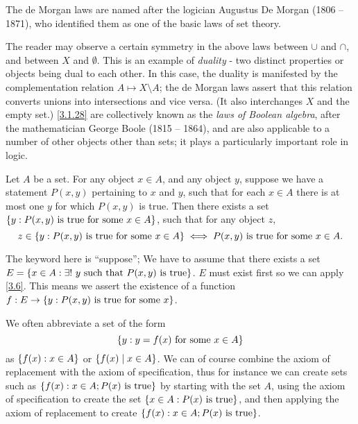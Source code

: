 \begin{rmk}\label{3.1.29}
  The de Morgan laws are named after the logician Augustus De Morgan (1806 -- 1871), who identified them as one of the basic laws of set theory.
\end{rmk}

\begin{rmk}\label{3.1.30}
  The reader may observe a certain symmetry in the above laws between \(\cup\) and \(\cap\), and between \(X\) and \(\emptyset\).
  This is an example of \emph{duality} - two distinct properties or objects being dual to each other.
  In this case, the duality is manifested by the complementation relation \(A \mapsto X \setminus A\);
  the de Morgan laws assert that this relation converts unions into intersections and vice versa.
  (It also interchanges \(X\) and the empty set.)
  \cref{3.1.28} are collectively known as the \emph{laws of Boolean algebra}, after the mathematician George Boole (1815 -- 1864), and are also applicable to a number of other objects other than sets;
  it plays a particularly important role in logic.
\end{rmk}

\begin{ax}[Replacement]\label{3.6}
  Let \(A\) be a set.
  For any object \(x \in A\), and any object \(y\), suppose we have a statement \(P(x, y)\) pertaining to \(x\) and \(y\), such that for each \(x \in A\) there is at most one \(y\) for which \(P(x, y)\) is true.
  Then there exists a set \(\left\lbrace y : P(x, y) \text{ is true for some } x \in A\right\rbrace\), such that for any object \(z\),
  \[
    z \in \left\lbrace y: P(x, y) \text{ is true for some } x \in A\right\rbrace \iff P(x, y) \text{ is true for some } x \in A.
  \]
\end{ax}

\begin{note}
  The keyword here is ``suppose'';
  We have to assume that there exists a set \(E = \left\lbrace x \in A : \exists!\ y \text{ such that } P(x, y) \text{ is true}\right\rbrace\).
  \(E\) must exist first so we can apply \cref{3.6}.
  This means we assert the existence of a function \(f : E \to \left\lbrace y : P(x, y) \text{ is true for some } x\right\rbrace\).
\end{note}

\begin{note}
  We often abbreviate a set of the form
  \[
    \left\lbrace y : y = f(x) \text{ for some } x \in A\right\rbrace
  \]
  as \(\left\lbrace f(x) : x \in A\right\rbrace\) or \(\left\lbrace f(x) \mid x \in A\right\rbrace\).
  We can of course combine the axiom of replacement with the axiom of specification, thus for instance we can create sets such as \(\left\lbrace f(x) : x \in A; P(x) \text{ is true}\right\rbrace\) by starting with the set \(A\), using the axiom of specification to create the set \(\left\lbrace x \in A : P(x) \text{ is true}\right\rbrace\), and then applying the axiom of replacement to create \(\left\lbrace f(x) : x \in A; P(x) \text{ is true}\right\rbrace\).
\end{note}

